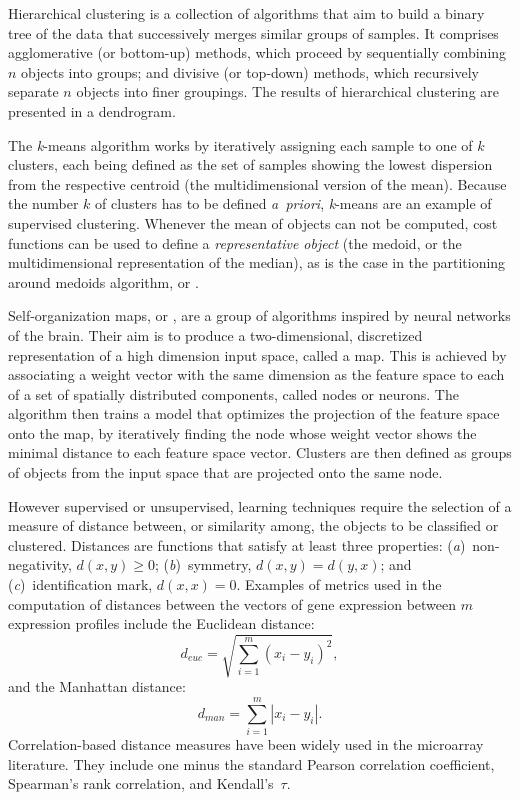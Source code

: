 Hierarchical clustering is a collection of algorithms that aim to build a binary
tree of the data that successively merges similar groups of samples.  It
comprises agglomerative (or bottom-up) methods, which proceed by sequentially
combining $n$ objects into groups; and divisive (or top-down) methods, which
recursively separate $n$ objects into finer groupings.  The results of
hierarchical clustering are presented in a dendrogram.

The \emph{k}-means algorithm works by iteratively assigning each sample to one
of $k$ clusters, each being defined as the set of samples showing the lowest
dispersion from the respective centroid (the multidimensional version of the
mean).  Because the number $k$ of clusters has to be defined \emph{a~priori},
\emph{k}-means are an example of supervised clustering.  Whenever the mean of
objects can not be computed, cost functions can be used to define a
\emph{representative object} (the medoid, or the multidimensional representation
of the median), as is the case in the partitioning around medoids algorithm, or
.

Self-organization maps, or , are a group of algorithms inspired
by neural networks of the brain.  Their aim is to produce a two-dimensional,
discretized representation of a high dimension input space, called a map.  This
is achieved by associating a weight vector with the same dimension as the
feature space to each of a set of spatially distributed components, called nodes
or neurons.  The algorithm then trains a model that optimizes the projection of
the feature space onto the map, by iteratively finding the node whose weight
vector shows the minimal distance to each feature space vector.  Clusters are
then defined as groups of objects from the input space that are projected onto
the same node.

However supervised or unsupervised, learning techniques require the selection of
a measure of distance between, or similarity among, the objects to be classified
or clustered.  Distances are functions that satisfy at least three properties:
(\emph{a})~non-negativity, $d(x,y)\ge 0$; (\emph{b})~symmetry, $d(x,y)=d(y,x)$;
and (\emph{c})~identification mark, $d(x,x)=0$.  Examples of metrics used in the
computation of distances between the vectors of gene expression between $m$
expression profiles include the Euclidean distance:
\begin{equation}
  \label{eq:euclidean-distance}
  d_{euc}=\sqrt{\sum_{i=1}^{m}(x_i-y_i)^2},
\end{equation}
and the Manhattan distance:
\begin{equation}
  \label{eq:manhattan-distance}
  d_{man}=\sum_{i=1}^{m}\left|x_i-y_i\right|.
\end{equation}
Correlation-based distance measures have been widely used in the microarray
literature.\cite{eisen_cluster_1998} They include one minus the standard Pearson
correlation coefficient, Spearman’s rank correlation, and Kendall’s~$\tau$.

